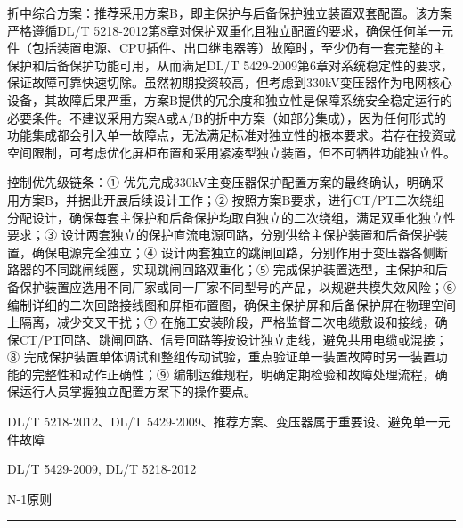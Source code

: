 \documentclass[12pt,a4paper]{ctexart}
\begin{document}
\begin{description}[leftmargin=1.5em,style=nextline,font=\normalfont]
折中综合方案：推荐采用方案B，即主保护与后备保护独立装置双套配置。该方案严格遵循DL/T 5218-2012第8章对保护双重化且独立配置的要求，确保任何单一元件（包括装置电源、CPU插件、出口继电器等）故障时，至少仍有一套完整的主保护和后备保护功能可用，从而满足DL/T 5429-2009第6章对系统稳定性的要求，保证故障可靠快速切除。虽然初期投资较高，但考虑到330kV变压器作为电网核心设备，其故障后果严重，方案B提供的冗余度和独立性是保障系统安全稳定运行的必要条件。不建议采用方案A或A/B的折中方案（如部分集成），因为任何形式的功能集成都会引入单一故障点，无法满足标准对独立性的根本要求。若存在投资或空间限制，可考虑优化屏柜布置和采用紧凑型独立装置，但不可牺牲功能独立性。

控制优先级链条：① 优先完成330kV主变压器保护配置方案的最终确认，明确采用方案B，并据此开展后续设计工作；② 按照方案B要求，进行CT/PT二次绕组分配设计，确保每套主保护和后备保护均取自独立的二次绕组，满足双重化独立性要求；③ 设计两套独立的保护直流电源回路，分别供给主保护装置和后备保护装置，确保电源完全独立；④ 设计两套独立的跳闸回路，分别作用于变压器各侧断路器的不同跳闸线圈，实现跳闸回路双重化；⑤ 完成保护装置选型，主保护和后备保护装置应选用不同厂家或同一厂家不同型号的产品，以规避共模失效风险；⑥ 编制详细的二次回路接线图和屏柜布置图，确保主保护屏和后备保护屏在物理空间上隔离，减少交叉干扰；⑦ 在施工安装阶段，严格监督二次电缆敷设和接线，确保CT/PT回路、跳闸回路、信号回路等按设计独立走线，避免共用电缆或混接；⑧ 完成保护装置单体调试和整组传动试验，重点验证单一装置故障时另一装置功能的完整性和动作正确性；⑨ 编制运维规程，明确定期检验和故障处理流程，确保运行人员掌握独立配置方案下的操作要点。
  \item[KW:] DL/T 5218-2012、DL/T 5429-2009、推荐方案、变压器属于重要设、避免单一元件故障
  \item[Std:] DL/T 5429-2009, DL/T 5218-2012
  \item[Topic:] N-1原则
\end{description}
\vspace{4pt}
\hrule\vspace{6pt}
\end{document}
